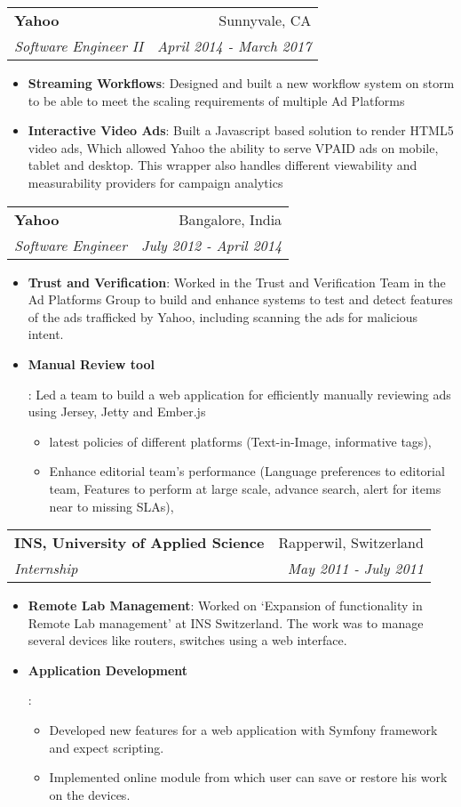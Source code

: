 \documentclass[letterpaper,11pt]{article}
\makeatletter
\newcommand{\resumeItem}[2]{
  \item\small{
    \textbf{#1}{: #2 \vspace{-2pt}}
  }
}
\newcommand{\resumeSubheading}[4]{
  \vspace{-1pt}\item
    \begin{tabular*}{0.97\textwidth}[t]{l@{\extracolsep{\fill}}r}
      \textbf{#1} & #2 \\
      \textit{\small#3} & \textit{\small #4} \\
    \end{tabular*}\vspace{-5pt}
}
\newcommand{\resumeItemListStart}{\begin{itemize}}
\newcommand{\resumeItemListEnd}{\end{itemize}\vspace{-5pt}}
\makeatother
\begin{document}
    \resumeSubheading
      {Yahoo}{Sunnyvale, CA} 
      {Software Engineer II}{April 2014 - March 2017}
      \resumeItemListStart
        \resumeItem {Streaming Workflows}
          {Designed and built a new workflow system on storm to be able to meet the scaling requirements of multiple Ad Platforms}
        \resumeItem {Interactive Video Ads} 
          {Built a Javascript based solution to render HTML5 video ads, Which allowed Yahoo the ability to serve VPAID ads on mobile, tablet and desktop. This wrapper also handles different viewability and measurability providers for campaign analytics}
      \resumeItemListEnd
        
    \resumeSubheading
      {Yahoo}{Bangalore, India} 
      {Software Engineer}{July 2012 - April 2014}
      \resumeItemListStart
        \resumeItem {Trust and Verification}
        {Worked in the Trust and Verification Team in the Ad Platforms Group to build and enhance systems to test and detect features of the ads trafficked by Yahoo, including scanning the ads for malicious intent.}
        \resumeItem {Manual Review tool}
        {Led a team to build a web application for efficiently manually reviewing ads using Jersey, Jetty and Ember.js
        \begin{itemize}
            \item latest policies of different platforms (Text-in-Image, informative tags),
            \item Enhance editorial team’s performance (Language preferences to editorial team, Features to perform at large scale, advance search, alert for items near to missing SLAs),
        \end{itemize}
        }
      \resumeItemListEnd
    \resumeSubheading
      {INS, University of Applied Science} {Rapperwil, Switzerland}
      {Internship} {May 2011 - July 2011}
      \resumeItemListStart
        \resumeItem {Remote Lab Management}
          {
          Worked on ‘Expansion of functionality in Remote Lab management’ at INS Switzerland. The work was to manage several devices like routers, switches using a web interface.
          }
        \resumeItem {Application Development} {
           \begin{itemize} 
              \item Developed new features for a web application with Symfony framework and expect scripting. 
              \item Implemented online module from which user can save or restore his work on the devices.
          \end{itemize}
        }
      \resumeItemListEnd
       
\end{document}
